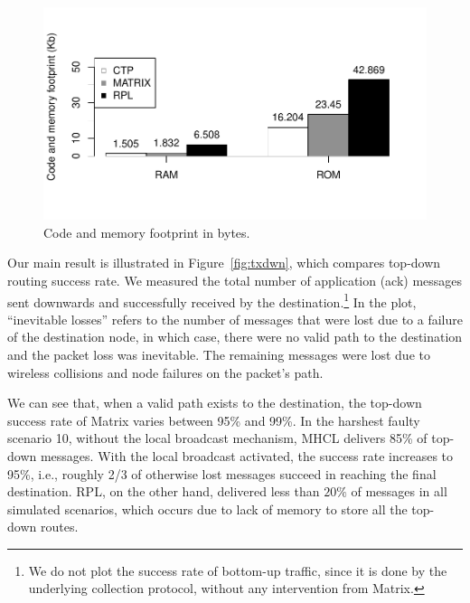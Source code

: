\begin{figure}[h]
    \centering
    \includegraphics[width=1\linewidth]{Images/footprint.pdf}
    \caption{Code and memory footprint in bytes.}
    \label{fig:footprint}
\end{figure}

Our main result is illustrated in Figure~\ref{fig:txdwn}, which compares
top-down routing success rate. We measured the total
number of application (ack) messages sent downwards and successfully received by
the destination.\footnote{We do not plot the success rate of bottom-up traffic,
since it is done by the underlying collection protocol, without any
intervention from Matrix.} In the plot, ``inevitable losses'' refers to the
number of messages that were lost due to a failure of the destination node, in which case, there were no
valid path to the destination and the packet loss was inevitable.
The remaining messages were lost due to wireless collisions and node failures on
the packet's path. 

We can see that, when a valid path exists to the destination, the top-down
success rate of Matrix varies between 95\% and 99\%. In the harshest
faulty scenario 10,
without the local broadcast mechanism, MHCL delivers 85\% of top-down messages.
With the local broadcast activated, the success rate increases to 95\%,
i.e., roughly 2/3 of otherwise lost messages succeed in reaching the final
destination.
RPL, on the other hand, delivered less than $20\%$ of messages in all simulated
scenarios, which occurs due to lack of memory to store all the top-down routes.


